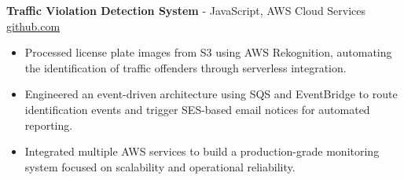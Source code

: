 \documentclass[11pt]{article}       %
\begin{document}

\textbf{Traffic Violation Detection System}{ - JavaScript, AWS Cloud Services} \hfill \href{https://github.com/Monica20030707/AWS_rekonigition-N-read-database}{github.com} \\
\vspace{-9pt}
\begin{itemize}
  \item Processed license plate images from S3 using AWS Rekognition, automating the identification of traffic offenders through serverless integration.
  \item Engineered an event-driven architecture using SQS and EventBridge to route identification events and trigger SES-based email notices for automated reporting.
  \item Integrated multiple AWS services to build a production-grade monitoring system focused on scalability and operational reliability.
\end{itemize}
\end{document}
